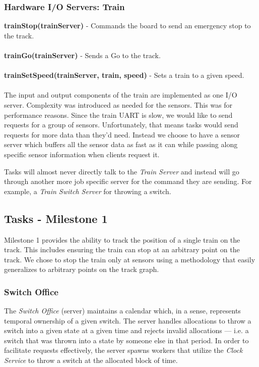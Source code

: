 \documentclass[twoside,a4paper]{refart}
\begin{document}
\subsubsection{Hardware I/O Servers: Train}

\textbf{trainStop(trainServer)} - Commands the board to send an emergency stop to the track.\\\\
\textbf{trainGo(trainServer)} - Sends a Go to the track.\\\\
\textbf{trainSetSpeed(trainServer, train, speed)} - Sets a train to a given speed.\\\\

The input and output components of the train are implemented as one I/O server. Complexity was introduced as needed for the sensors. This was for performance reasons. Since the train UART is slow, we would like to send requests for a group of sensors. Unfortunately, that means tasks would send requests for more data than they’d need. Instead we choose to have a sensor server which buffers all the sensor data as fast as it can while passing along specific sensor information when clients request it.

Tasks will almost never directly talk to the \textit{Train Server} and instead will go through another more job specific server for the command they are sending. For example, a \textit{Train Switch Server} for throwing a switch.

\subsection{Tasks - Milestone 1}
Milestone 1 provides the ability to track the position of a single train on the track. This includes ensuring the train can stop at an arbitrary point on the track. We chose to stop the train only at sensors using a methodology that easily generalizes to arbitrary points on the track graph.

\subsubsection{Switch Office}
The \textit{Switch Office} (server) maintains a calendar which, in a sense, represents temporal ownership of a given switch. The server handles allocations to throw a switch into a given state at a given time and rejects invalid allocations --- i.e. a switch that was thrown into a state by someone else in that period. In order to facilitate requests effectively, the server spawns workers that utilize the \textit{Clock Service} to throw a switch at the allocated block of time.
\end{document}
